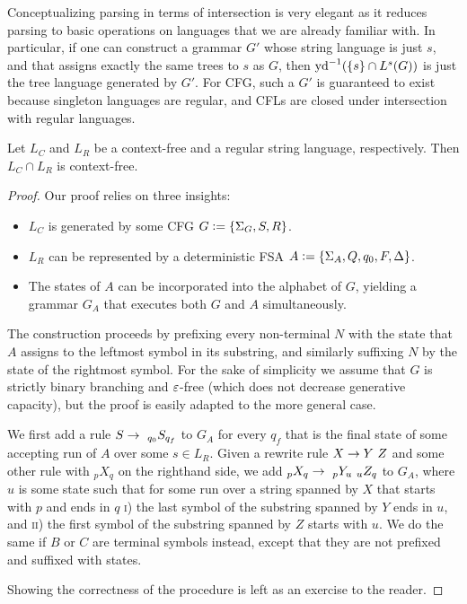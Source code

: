 Conceptualizing parsing in terms of intersection is very elegant as it reduces parsing to basic operations on languages that we are already familiar with.
In particular, if one can construct a grammar $G'$ whose string language is just $s$, and that assigns exactly the same trees to $s$ as $G$, then $\mathrm{yd}^{-1}(\left \{ s \right \} \cap L^s(G))$ is just the tree language generated by $G'$.
For CFG, such a $G'$ is guaranteed to exist because singleton languages are regular, and CFLs are closed under intersection with regular languages.
%
\begin{theorem}
    Let $L_C$ and $L_R$ be a context-free and a regular string language, respectively.
    Then $L_C \cap L_R$ is context-free.
\end{theorem}
%
\begin{proof}
    Our proof relies on three insights:
    \begin{itemize}
        \item $L_C$ is generated by some CFG $G \mathrel{\mathop:}= \left \{ \Sigma_G,S,R \right \}$.
        \item $L_R$ can be represented by a deterministic FSA $A \mathrel{\mathop:}= \left \{ \Sigma_A,Q,q_0,F,\Delta \right \}$.
        \item The states of $A$ can be incorporated into the alphabet of $G$, yielding a grammar $G_A$ that executes both $G$ and $A$ simultaneously.
    \end{itemize}
    The construction proceeds by prefixing every non-terminal $N$ with the state that $A$ assigns to the leftmost symbol in its substring, and similarly suffixing $N$ by the state of the rightmost symbol.
    For the sake of simplicity we assume that $G$ is strictly binary branching and $\varepsilon$-free (which does not decrease generative capacity), but the proof is easily adapted to the more general case.

    We first add a rule $S \rightarrow\  _{q_0}S_{q_f}$ to $G_A$ for every $q_f$ that is the final state of some accepting run of $A$ over some $s \in L_R$.
    Given a rewrite rule $X \rightarrow Y\ Z$ and some other rule with $_p X _q$ on the righthand side, we add $_p X _q \rightarrow \ _p Y _u\ _u Z_q$ to $G_A$, where $u$ is some state such that for some run over a string spanned by $X$ that starts with $p$ and ends in $q$ \textsc{i}) the last symbol of the substring spanned by $Y$ ends in $u$, and \textsc{ii}) the first symbol of the substring spanned by $Z$ starts with $u$.
    We do the same if $B$ or $C$ are terminal symbols instead, except that they are not prefixed and suffixed with states.

    Showing the correctness of the procedure is left as an exercise to the reader.
\end{proof}

